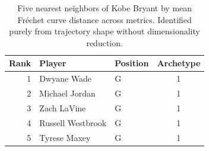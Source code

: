 \begin{table}[htbp]
  \centering\small
  \begin{tabular}{rllc}
    \toprule
    Rank & Player & Position & Archetype \\
    \midrule
    1 & Dwyane Wade & G & 1 \\
    2 & Michael Jordan & G & 1 \\
    3 & Zach LaVine & G & 1 \\
    4 & Russell Westbrook & G & 1 \\
    5 & Tyrese Maxey & G & 1 \\
    \bottomrule
  \end{tabular}
  \caption{Five nearest neighbors of Kobe Bryant by mean Fr\'{e}chet curve distance across metrics. Identified purely from trajectory shape without dimensionality reduction.}
  \label{tab:Kobe_Bryant_frechet_curve_neighbors}
\end{table}

